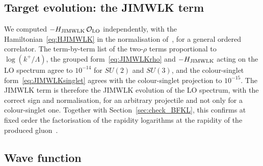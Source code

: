 \subsection{Target evolution: the JIMWLK term}\label{sec:check_JIMWLK}

We computed $-H_{\rm JIMWLK}\,\mathcal O_{\rm LO}$ independently, with the Hamiltonian~\eqref{eq:HJIMWLK} in the normalisation of~\cite{Lublinsky:2016meo,Kovner:2013ona}, for a general ordered correlator. The term-by-term list of the two-$\rho$ terms proportional to $\log(k^+/\Lambda)$, the grouped form~\eqref{eq:JIMWLKrho} and $-H_{\rm JIMWLK}$ acting on the LO spectrum agree to $10^{-14}$ for $SU(2)$ and $SU(3)$, and the colour-singlet form~\eqref{eq:JIMWLKsinglet} agrees with the colour-singlet projection to $10^{-15}$. The JIMWLK term is therefore the JIMWLK evolution of the LO spectrum, with the correct sign and normalisation, for an arbitrary projectile and not only for a colour-singlet one. Together with Section~\ref{sec:check_BFKL}, this confirms at fixed order the factorisation of the rapidity logarithms at the rapidity of the produced gluon~\cite{Kovner:2006wr,Kovner:2006ge,Gelis:2008rw}.

\subsection{Wave function}\label{sec:check_wf}

